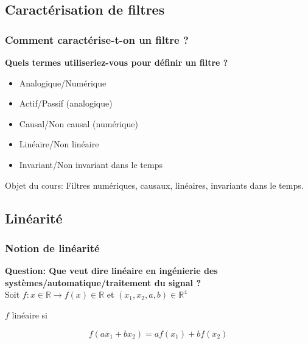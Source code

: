 \documentclass{beamer}
\begin{document}
\subsection{Caractérisation de filtres}
\begin{frame}
\frametitle{Comment caractérise-t-on un filtre ?}
\textbf{Quels termes utiliseriez-vous pour définir un filtre ?}
\vspace{1cm}
\begin{itemize}
\item<2-> Analogique/Numérique
\vspace{0.2cm}
\item<3-> Actif/Passif (analogique)
\vspace{0.2cm}
\item<4-> Causal/Non causal (numérique)
\vspace{0.2cm}
\item<5-> Linéaire/Non linéaire 
\vspace{0.2cm}
\item<6-> Invariant/Non invariant dans le temps
\end{itemize}
{
\begin{block}{}
Objet du cours: Filtres numériques, causaux, linéaires, invariants dans le temps.
\end{block}
}
\end{frame}



\subsection{Linéarité}
\begin{frame}
\frametitle{Notion de linéarité}
\textbf{Question: Que veut dire linéaire en ingénierie des systèmes/automatique/traitement du signal ? \label{linéaire ?} }\\
\vspace{1 cm}
{
Soit $f : x \in \mathbb{R} \rightarrow f(x) \in \mathbb{R} $ et $(x_1,x_2,a,b) \in \mathbb{R}^4$
\\}
\vspace{1 cm}
{
$f$ linéaire si\\
\vspace{0.5 cm}

\[\boxed{f(a x_1 + b x_2) = a f(x_1) + b f(x_2)}\]

}

\end{frame}
\end{document}
